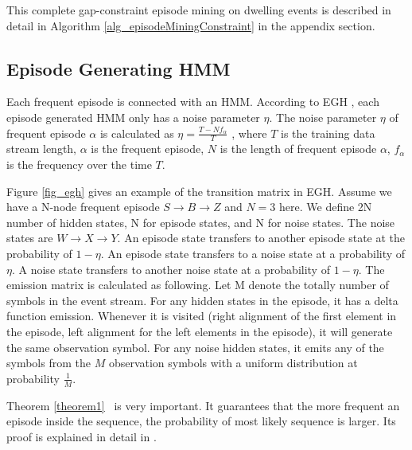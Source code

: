This complete gap-constraint episode mining on dwelling events 
is described in detail in Algorithm \ref{alg_episodeMiningConstraint}
in the appendix section.


\subsection{Episode Generating HMM}
Each frequent episode is connected with an HMM. 
According to EGH \cite{laxman2005discovering}, 
each episode generated HMM 
only has a noise parameter $\eta$.
The noise parameter $\eta$ of frequent episode $\alpha$ 
is calculated as $\eta=\frac{T-Nf_{\alpha}}{T}$ \cite{laxman2005discovering},  
where $T$ is the training data stream length, 
$\alpha$ is the frequent episode, 
$N$ is the length of frequent episode $\alpha$, 
$f_{\alpha}$ is the frequency over the time $T$.

Figure \ref{fig_egh} gives an example of the transition matrix in EGH. 
Assume we have a N-node frequent episode $S\rightarrow B\rightarrow Z$ and $N=3$ here.
We define 2N number of hidden states, 
N for episode states, and N for noise states. 
The noise states are $W\rightarrow X \rightarrow Y$. 
An episode state transfers to another episode state 
at the probability of $1-\eta$.
An episode state transfers to a noise state 
at a probability of $\eta$. 
A noise state transfers to another noise state 
at a probability of $1-\eta$. 
The emission matrix is calculated as following. 
Let M denote the totally number of symbols in the event stream. 
For any hidden states in the episode, it has a delta function emission. 
Whenever it is visited (right alignment of the first element in the episode, 
left alignment for the left elements in the episode), 
it will generate the same observation symbol. 
For any noise hidden states, it emits any of the symbols from the $M$ 
observation symbols with a uniform distribution at probability $\frac{1}{M}$. 



Theorem \ref{theorem1}~\cite{laxman2005discovering} is very important. 
It guarantees that the more frequent an episode inside the sequence, 
the probability of most likely sequence is larger. 
Its proof is explained in detail in \cite{laxman2005discovering}. 



